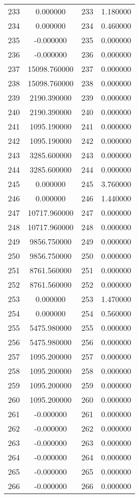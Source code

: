 \documentclass[12pt]{article}
\begin{document}
\begin{longtable}{@{}cccc@{}}
233 & 0.000000 & 233 & 1.180000 \\
234 & 0.000000 & 234 & 0.460000 \\
235 & -0.000000 & 235 & 0.000000 \\
236 & -0.000000 & 236 & 0.000000 \\
237 & 15098.760000 & 237 & 0.000000 \\
238 & 15098.760000 & 238 & 0.000000 \\
239 & 2190.390000 & 239 & 0.000000 \\
240 & 2190.390000 & 240 & 0.000000 \\
241 & 1095.190000 & 241 & 0.000000 \\
242 & 1095.190000 & 242 & 0.000000 \\
243 & 3285.600000 & 243 & 0.000000 \\
244 & 3285.600000 & 244 & 0.000000 \\
245 & 0.000000 & 245 & 3.760000 \\
246 & 0.000000 & 246 & 1.440000 \\
247 & 10717.960000 & 247 & 0.000000 \\
248 & 10717.960000 & 248 & 0.000000 \\
249 & 9856.750000 & 249 & 0.000000 \\
250 & 9856.750000 & 250 & 0.000000 \\
251 & 8761.560000 & 251 & 0.000000 \\
252 & 8761.560000 & 252 & 0.000000 \\
253 & 0.000000 & 253 & 1.470000 \\
254 & 0.000000 & 254 & 0.560000 \\
255 & 5475.980000 & 255 & 0.000000 \\
256 & 5475.980000 & 256 & 0.000000 \\
257 & 1095.200000 & 257 & 0.000000 \\
258 & 1095.200000 & 258 & 0.000000 \\
259 & 1095.200000 & 259 & 0.000000 \\
260 & 1095.200000 & 260 & 0.000000 \\
261 & -0.000000 & 261 & 0.000000 \\
262 & -0.000000 & 262 & 0.000000 \\
263 & -0.000000 & 263 & 0.000000 \\
264 & -0.000000 & 264 & 0.000000 \\
265 & -0.000000 & 265 & 0.000000 \\
266 & -0.000000 & 266 & 0.000000 \\

\end{longtable}
\end{document}
